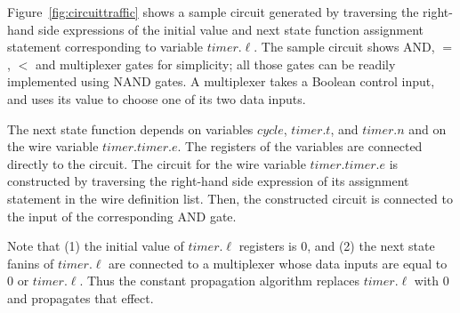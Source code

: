 \begin{example}
Figure~\ref{fig:circuittraffic} shows a sample circuit generated 
by traversing the right-hand side expressions of the initial 
value and next state function assignment statement corresponding to variable
$timer.\ell$. 
The sample circuit shows AND, $=$, $<$ and multiplexer gates for simplicity; 
all those gates can be readily implemented using NAND gates. 
A multiplexer takes a Boolean control input, and uses its value to 
choose one of its two data inputs. 

The next state function depends on variables $cycle$, $timer.t$, and $timer.n$ and on 
the wire variable $timer.timer.e$. 
The registers of the variables are connected directly to the circuit. 
The circuit for the wire variable $timer.timer.e$ is constructed by traversing 
the right-hand side expression of its 
assignment statement in the wire definition list. 
Then, the constructed circuit is connected to the input of the corresponding AND gate. 

Note that (1) the initial value of $timer.\ell$ registers is $0$, and  (2) the next state fanins of $timer.\ell$ are connected to a multiplexer whose data inputs are equal to $0$ or $timer.\ell$. Thus the constant propagation algorithm replaces $timer.\ell$ with $0$ and propagates that effect. 

\end{example}

